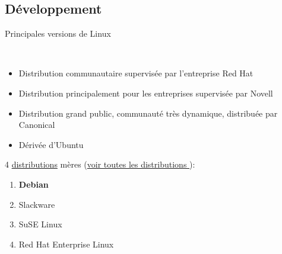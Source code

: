 \documentclass{beamer}
\begin{document}
\subsection*{D\'eveloppement}
\begin{frame}
  \begin{block}{ Principales versions de Linux}

    ~~~~~~~~~~~~~~~~%
    \begin{minipage}[t]{0.85\linewidth}
      \begin{itemize}
      \item[Fedora :] Distribution communautaire supervisée par l'entreprise Red Hat
      \item[openSUSE :] Distribution principalement pour les entreprises supervis\'ee par Novell
      \item[Ubuntu :] Distribution grand public, communaut\'e tr\`es dynamique, distribuée par Canonical
      \item[Linux Mint :] Dérivée d'Ubuntu
      \end{itemize}
    \end{minipage}

  \end{block}

\vspace{3mm}
4 \href{https://fr.wikipedia.org/wiki/Distribution_Linux}{distributions} mères (\href{https://fr.wikipedia.org/wiki/Liste_des_distributions_GNU/Linux}{voir toutes les distributions \faExternalLink}):\\
\begin{enumerate}
\item \textbf{Debian}
\item Slackware
\item SuSE Linux
\item Red Hat Enterprise Linux
\end{enumerate}
\end{frame}
\end{document}
